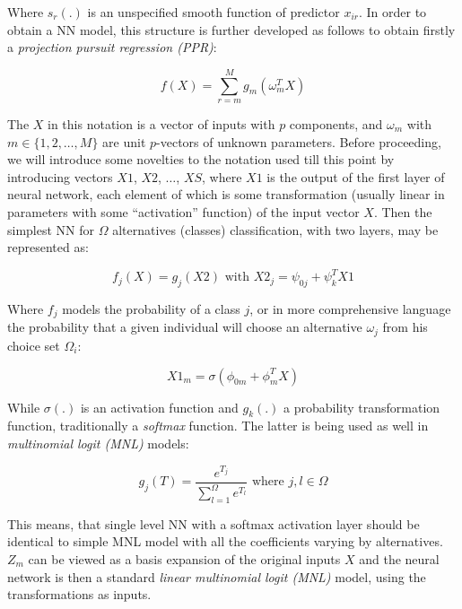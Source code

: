 \documentclass[12pt,]{article}
\begin{document}
Where \(s_r(.)\) is an unspecified smooth function of predictor
\(x_{ir}\). In order to obtain a NN model, this structure is further
developed as follows to obtain firstly a \emph{projection pursuit
regression (PPR)}:

\begin{equation}
f(X) = \sum_{r = m}^{M} g_m (\omega_{m}^{T} X)
\end{equation}

The \(X\) in this notation is a vector of inputs with \(p\) components,
and \(\omega_{m}\) with \(m \in \{1, 2, \dots, M \}\) are unit
\(p\)-vectors of unknown parameters. Before proceeding, we will
introduce some novelties to the notation used till this point by
introducing vectors \(X1\), \(X2\), \(\dots\), \(XS\), where \(X1\) is
the output of the first layer of neural network, each element of which
is some transformation (usually linear in parameters with some
``activation'' function) of the input vector \(X\). Then the simplest NN
for \(\Omega\) alternatives (classes) classification, with two layers,
may be represented as:

\begin{equation}
f_j (X) = g_j (X2) \text{ with } X2_j = \psi_{0j} + \psi_{k}^{T} X1
\end{equation}

Where \(f_j\) models the probability of a class \(j\), or in more
comprehensive language the probability that a given individual will
choose an alternative \(\omega_j\) from his choice set \(\Omega_i\):

\begin{equation}
X1_m = \sigma(\phi_{0m} + \phi_{m}^{T} X)
\end{equation}

While \(\sigma(.)\) is an activation function and \(g_k(.)\) a
probability transformation function, traditionally a \emph{softmax}
function. The latter is being used as well in \emph{multinomial logit
(MNL)} models:

\begin{equation}
g_j(T) = \frac{e^{T_j}}{\sum_{l = 1}^{\Omega} e^{T_l}} \text{ where } j,l \in \Omega
\end{equation}

This means, that single level NN with a softmax activation layer should
be identical to simple MNL model with all the coefficients varying by
alternatives. \(Z_m\) can be viewed as a basis expansion of the original
inputs \(X\) and the neural network is then a standard \emph{linear
multinomial logit (MNL)} model, using the transformations as inputs.
\end{document}
